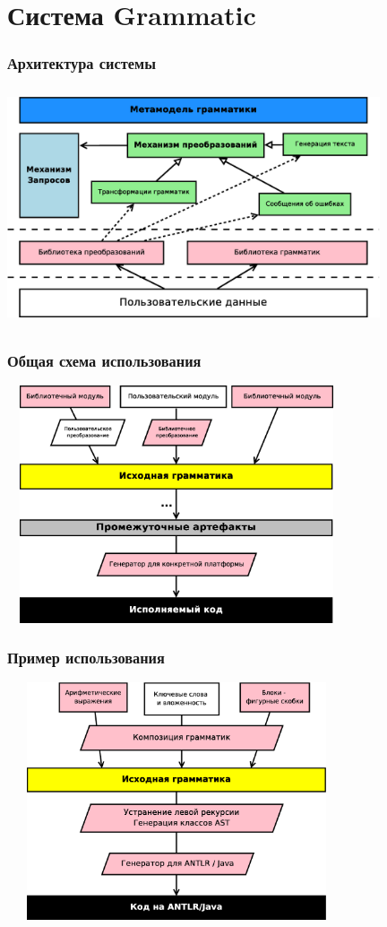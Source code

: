 \documentclass[paper=screen,10pt,unicode]{beamer}
\begin{document}
\section{Система Grammatic}

\begin{frame}
	\frametitle{Архитектура системы}
	\includegraphics[width=110mm,height=70mm]{grammatic_structure.eps}	
\end{frame}

\begin{frame}
	\frametitle{Общая схема использования}
	\begin{center}
 		\includegraphics[width=100mm,height=70mm]{grammatic_usage.eps}	
	\end{center}
\end{frame}

\begin{frame}
	\frametitle{Пример использования}
	\begin{center}
 		\includegraphics[width=100mm,height=70mm]{grammatic_usage_example.eps}	
	\end{center}
\end{frame}
\end{document}
